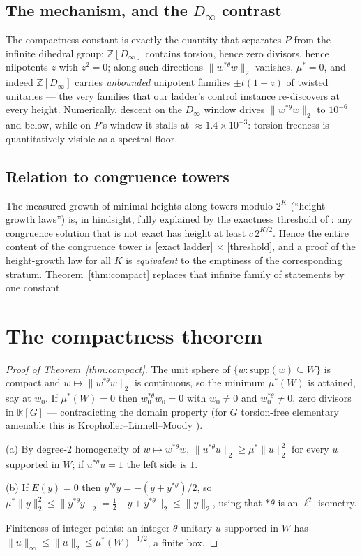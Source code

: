 \documentclass[10pt,a4paper]{amsart}
\newcommand{\ZZ}{\mathbb{Z}}
\newcommand{\RR}{\mathbb{R}}
\newcommand{\thst}{{*\theta}}
\newcommand{\supp}{\mathrm{supp}}
\begin{document}
\subsection*{The mechanism, and the $D_\infty$ contrast}

The compactness constant is exactly the quantity that separates $P$
from the infinite dihedral group: $\ZZ[D_\infty]$ contains torsion,
hence zero divisors, hence nilpotents $z$ with $z^2=0$; along such
directions $\|w^{\thst}w\|_2$ vanishes, $\mu^*=0$, and indeed
$\ZZ[D_\infty]$ carries \emph{unbounded} unipotent families
$\pm t(1+z)$ of twisted unitaries --- the very families that our
ladder's control instance re-discovers at every height.  Numerically,
descent on the $D_\infty$ window drives $\|w^{\thst}w\|_2$ to
$10^{-6}$ and below, while on $P$'s window it stalls at
$\approx 1.4\times10^{-3}$: torsion-freeness is quantitatively visible
as a spectral floor.

\subsection*{Relation to congruence towers}

The measured growth of minimal heights along towers modulo $2^K$
(``height-growth laws'') is, in hindsight, fully explained by the
exactness threshold of \cite{paper5}: any congruence solution that is
not exact has height at least $c\,2^{K/2}$.  Hence the entire content
of the congruence tower is [exact ladder] $\times$ [threshold], and a
proof of the height-growth law for all $K$ is \emph{equivalent} to the
emptiness of the corresponding stratum.  Theorem~\ref{thm:compact}
replaces that infinite family of statements by one constant.

\section{The compactness theorem}\label{sec:compact}


\begin{proof}[Proof of Theorem~\ref{thm:compact}]
The unit sphere of $\{w:\supp(w)\subseteq W\}$ is compact and
$w\mapsto \|w^{\thst}w\|_2$ is continuous, so the minimum
$\mu^*(W)$ is attained, say at $w_0$.  If $\mu^*(W)=0$ then
$w_0^{\thst}w_0=0$ with $w_0\ne 0$ and $w_0^{\thst}\neq0$, zero
divisors in $\RR[G]$ --- contradicting the domain property (for
$G$ torsion-free elementary amenable this is
Kropholler--Linnell--Moody \cite{KLM}).

(a) By degree-2 homogeneity of $w\mapsto w^{\thst}w$,
$\|u^{\thst}u\|_2\ge\mu^*\|u\|_2^2$ for every $u$ supported in $W$;
if $u^{\thst}u=1$ the left side is $1$.

(b) If $E(y)=0$ then $y^{\thst}y=-(y+y^{\thst})/2$, so
$\mu^*\|y\|_2^2\le\|y^{\thst}y\|_2=\tfrac12\|y+y^{\thst}\|_2\le
\|y\|_2$, using that $\thst$ is an $\ell^2$ isometry.

Finiteness of integer points: an integer $\theta$-unitary $u$
supported in $W$ has $\|u\|_\infty\le\|u\|_2\le\mu^*(W)^{-1/2}$, a
finite box.
\end{proof}
\end{document}
